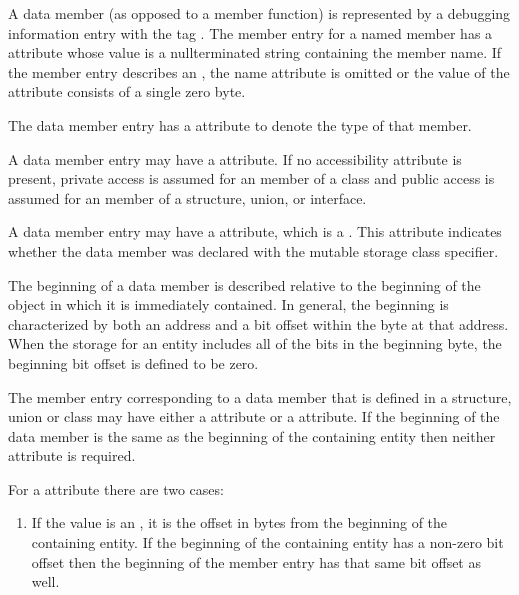 {A data member (as opposed to a member function) is
represented by a debugging information entry with the 
tag \DWTAGmemberTARG. 
The 
member entry for a named member has
a \DWATname{} attribute 
whose value is a null\dash terminated
string containing the member name.
If the member entry describes an 
,
the name attribute is omitted or the value of the attribute
consists of a single zero byte.

The data member entry has a 
\DWATtype{} attribute to denote
 the type of that member.

A data member entry may have a 
\hyperlink{chap:DWATaccessibilityattribute}{\DWATaccessibilityNAME}
attribute. 
If no accessibility attribute is present, private
access is assumed for an member of a class and public access
is assumed for an member of a structure, union, or interface.

A\hypertarget{chap:DWATmutablemutablepropertyofmemberdata}{}
data member entry 
may have a 
\DWATmutableDEFN{} attribute,
which is a . 
This attribute indicates whether the data
member was declared with the mutable storage class specifier.

The beginning of a data member 
is described relative to
the beginning of the object in which it is immediately
contained. In general, the beginning is characterized by
both an address and a bit offset within the byte at that
address. When the storage for an entity includes all of
the bits in the beginning byte, the beginning bit offset is
defined to be zero.

The\hypertarget{chap:DWATdatabitoffsetdatamemberbitlocation}{}
member\hypertarget{chap:DWATdatamemberlocationdatamemberlocation}{} 
entry 
corresponding to a data member that is defined
in a structure, union or class may have either a 
\DWATdatamemberlocationDEFN{} attribute
or a \DWATdatabitoffsetDEFN{} attribute. 
If the beginning of the data member is the same as
the beginning of the containing entity then neither attribute
is required.

For a \DWATdatamemberlocation{} attribute
there are two cases:
\begin{enumerate}[1. ]
\item If the value is an 
, 
it is the offset
in bytes from the beginning of the containing entity. If
the beginning of the containing entity has a non-zero bit
offset then the beginning of the member entry has that same
bit offset as well.


\end{enumerate}}
